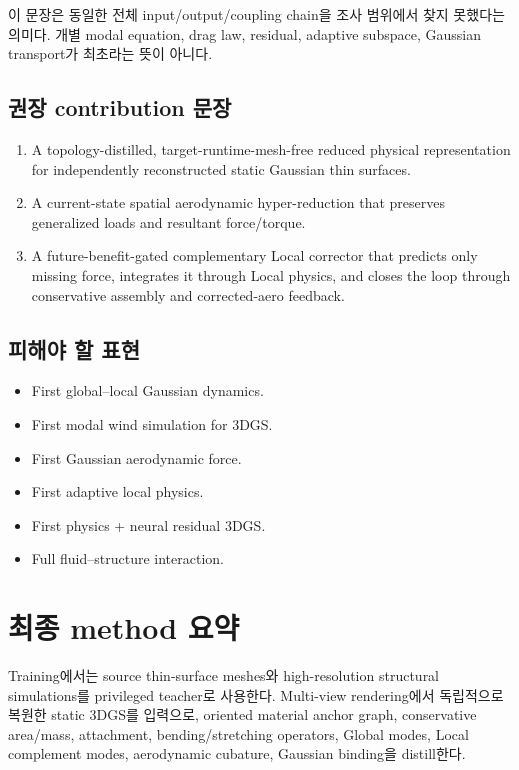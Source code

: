 \documentclass[11pt,a4paper]{article}
\begin{document}
이 문장은 동일한 전체 input/output/coupling chain을 조사 범위에서 찾지 못했다는 의미다.
개별 modal equation, drag law, residual, adaptive subspace,
Gaussian transport가 최초라는 뜻이 아니다.

\subsection{권장 contribution 문장}

\begin{enumerate}[leftmargin=1.7em]
  \item A topology-distilled, target-runtime-mesh-free reduced physical representation
  for independently reconstructed static Gaussian thin surfaces.
  \item A current-state spatial aerodynamic hyper-reduction that preserves
  generalized loads and resultant force/torque.
  \item A future-benefit-gated complementary Local corrector that predicts
  only missing force, integrates it through Local physics, and closes the loop
  through conservative assembly and corrected-aero feedback.
\end{enumerate}

\subsection{피해야 할 표현}

\begin{itemize}[leftmargin=1.5em]
  \item First global--local Gaussian dynamics.
  \item First modal wind simulation for 3DGS.
  \item First Gaussian aerodynamic force.
  \item First adaptive local physics.
  \item First physics + neural residual 3DGS.
  \item Full fluid--structure interaction.
\end{itemize}

\section{최종 method 요약}

Training에서는 source thin-surface meshes와 high-resolution structural simulations를
privileged teacher로 사용한다.
Multi-view rendering에서 독립적으로 복원한 static 3DGS를 입력으로,
oriented material anchor graph, conservative area/mass,
attachment, bending/stretching operators, Global modes,
Local complement modes, aerodynamic cubature,
Gaussian binding을 distill한다.
\end{document}
